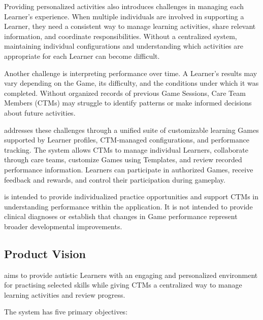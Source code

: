 \documentclass[12pt]{article}
\begin{document}
Providing personalized activities also introduces challenges in managing each
Learner's experience. When multiple individuals are involved in supporting a
Learner, they need a consistent way to manage learning activities, share
relevant information, and coordinate responsibilities. Without a centralized
system, maintaining individual configurations and understanding which activities
are appropriate for each Learner can become difficult.

Another challenge is interpreting performance over time. A Learner's results may
vary depending on the Game, its difficulty, and the conditions under which it
was completed. Without organized records of previous Game Sessions, Care Team
Members (CTMs) may struggle to identify patterns or make informed decisions
about future activities.

\progname{} addresses these challenges through a unified suite of customizable
learning Games supported by Learner profiles, CTM-managed configurations, and
performance tracking. The system allows CTMs to manage individual Learners,
collaborate through care teams, customize Games using Templates, and review
recorded performance information. Learners can participate in authorized Games,
receive feedback and rewards, and control their participation during gameplay.

\progname{} is intended to provide individualized practice opportunities and
support CTMs in understanding performance within the application. It is not
intended to provide clinical diagnoses or establish that changes in Game
performance represent broader developmental improvements.

\subsection{Product Vision} \label{sec_ProductVision}

\progname{} aims to provide autistic Learners with an engaging and personalized
environment for practising selected skills while giving CTMs a centralized way
to manage learning activities and review progress.

The system has five primary objectives:
\end{document}
